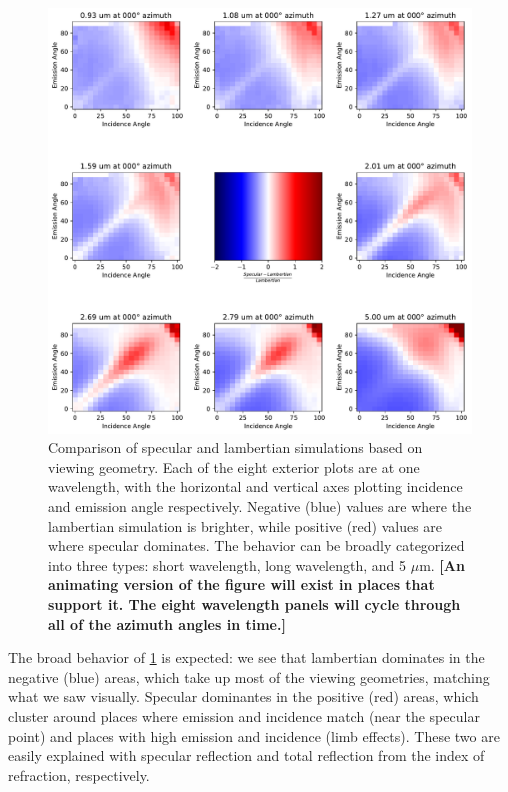 \documentclass[twocolumn,linenumbers]{aastex631}
\begin{document}
\begin{figure}[htbp]
\includegraphics[scale = 0.54]{SpecLambNormDiff.pdf}
\centering
\caption{Comparison of specular and lambertian simulations based on viewing geometry. Each of the eight exterior plots are at one wavelength, with the horizontal and vertical axes plotting incidence and emission angle respectively. Negative (blue) values are where the lambertian simulation is brighter, while positive (red) values are where specular dominates. The behavior can be broadly categorized into three types: short wavelength, long wavelength, and 5 $\mu$m. \textbf{\color{red} [An animating version of the figure will exist in places that support it. The eight wavelength panels will cycle through all of the azimuth angles in time.] \color{black}}}
\label{fig:10}
\end{figure}

The broad behavior of \ref{fig:10} is expected: we see that lambertian dominates in the negative (blue) areas, which take up most of the viewing geometries, matching what we saw visually. Specular dominantes in the positive (red) areas, which cluster around places where emission and incidence match (near the specular point) and places with high emission and incidence (limb effects). These two are easily explained with specular reflection and total reflection from the index of refraction, respectively.
\end{document}

